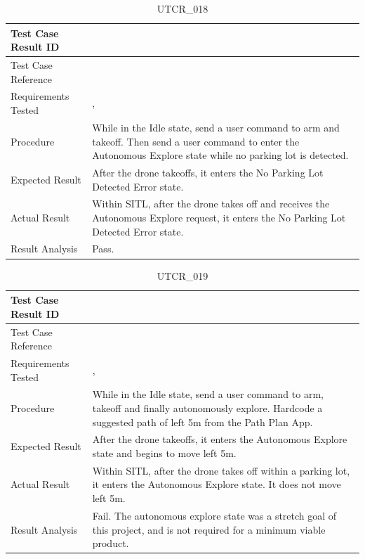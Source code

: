\documentclass[12pt, titlepage]{article}
\begin{document}
\begin{table}[!h]
\begin{center}
\caption {UTCR\_018}
\label{tab:UTCR_018}
\begin{tabular}{ | m{3.2cm} | m{12.2cm} | } 
\hline
Test Case Result ID & \nameref{tab:UTCR_018} \\ 
\hline
Test Case Reference & \nameref{tab:UTC_018}  \\ 
\hline
Requirements Tested & \nameref{STA_008}, \nameref{TRANS_008} \\ 
\hline
Procedure & While in the Idle state, send a user command to arm and takeoff. Then send a user command to enter the Autonomous Explore state while no parking lot is detected. \\ 
\hline
Expected Result & After the drone takeoffs, it enters the No Parking Lot Detected Error state. \\
\hline
Actual Result & Within SITL, after the drone takes off and receives the Autonomous Explore request, it enters the No Parking Lot Detected Error state. \\
\hline
Result Analysis & Pass. \\ 
\hline
\end{tabular}
\end{center}
\end{table}

\begin{table}[!h]
\begin{center}
\caption {UTCR\_019}
\label{tab:UTCR_019}
\begin{tabular}{ | m{3.2cm} | m{12.2cm} | } 
\hline
Test Case Result ID & \nameref{tab:UTCR_019} \\ 
\hline
Test Case Reference & \nameref{tab:UTC_019}  \\ 
\hline
Requirements Tested & \nameref{STA_003}, \nameref{TRANS_004} \\ 
\hline
Procedure & While in the Idle state, send a user command to arm, takeoff and finally autonomously explore. Hardcode a suggested path of left 5m from the Path Plan App. \\ 
\hline
Expected Result & After the drone takeoffs, it enters the Autonomous Explore state and begins to move left 5m. \\
\hline
Actual Result & Within SITL, after the drone takes off within a parking lot, it enters the Autonomous Explore state. It does not move left 5m.  \\
\hline
Result Analysis & Fail. The autonomous explore state was a stretch goal of this project, and is not required for a minimum viable product. \\ 
\hline
\end{tabular}
\end{center}
\end{table}
\end{document}
